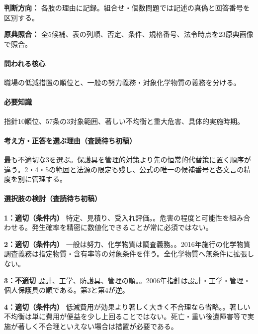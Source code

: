 \noindent\textbf{判断方向：} 各肢の理由に記録。組合せ・個数問題では記述の真偽と回答番号を区別する。\par

\noindent\textbf{原典照合：} 全5候補、表の列順、否定、条件、規格番号、法令時点を23原典画像で照合。\par

\paragraph{問われる核心} 職場の低減措置の順位と、一般の努力義務・対象化学物質の義務を分ける。

\paragraph{必要知識} 指針10順位、57条の3対象範囲、著しい不均衡と重大危害、具体的実施時期。

\paragraph{考え方・正答を選ぶ理由（査読待ち初稿）} 最も不適切な3を選ぶ。保護具を管理的対策より先の恒常的代替策に置く順序が違う。2・4・5の範囲と法源の限定も残し、公式の唯一の候補番号と各文言の精度を別に管理する。

\paragraph{選択肢の検討（査読待ち初稿）}\mbox{}\par

\noindent\textbf{1：適切（条件内）} 特定、見積り、受入れ評価。。危害の程度と可能性を組み合わせる。発生確率を精密に数値化できることが常に必須ではない。\par

\noindent\textbf{2：適切（条件内）} 一般は努力、化学物質は調査義務。。2016年施行の化学物質調査義務は指定物質・含有率等の対象条件を伴う。全化学物質へ無条件に拡張しない。\par

\noindent\textbf{3：不適切} 設計、工学、防護具、管理の順。。2006年指針は設計・工学・管理・個人保護具の順である。第3と第4が逆。\par

\noindent\textbf{4：適切（条件内）} 低減費用が効果より著しく大きく不合理なら省略。。著しい不均衡は単に費用が便益を少し上回ることではない。死亡・重い後遺障害等で実施が著しく不合理といえない場合は措置が必要である。\par

